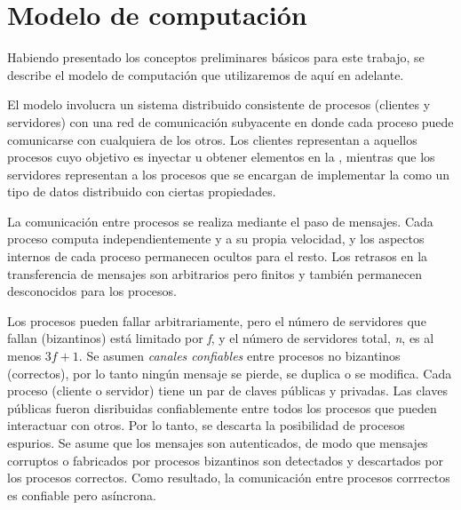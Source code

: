 \section{Modelo de computación}\label{sec:model_system}
Habiendo presentado los conceptos preliminares básicos para este trabajo, se describe
el modelo de computación que utilizaremos de aquí en adelante.

El modelo involucra un sistema distribuido consistente de procesos (clientes y servidores) con una
red de comunicación subyacente en donde cada proceso puede comunicarse con cualquiera de los otros.
Los clientes representan a aquellos procesos cuyo objetivo es inyectar u obtener elementos en la \setchain,
mientras que los servidores representan a los procesos que se encargan de implementar la \setchain
como un tipo de datos distribuido con ciertas propiedades.

La comunicación entre procesos se realiza mediante el paso de mensajes.
Cada proceso computa independientemente y a su propia velocidad, y los aspectos internos de cada proceso
permanecen ocultos para el resto. Los retrasos en la transferencia de mensajes son arbitrarios pero finitos
y también permanecen desconocidos para los procesos.

Los procesos pueden fallar arbitrariamente, pero el número de servidores que fallan (bizantinos) está
limitado por \textit{f}, y el número de servidores total, \textit{n}, es al menos $3f + 1$.
Se asumen \textit{canales confiables} entre procesos no bizantinos (correctos), por lo tanto ningún
mensaje se pierde, se duplica o se modifica.
Cada proceso (cliente o servidor) tiene un par de claves públicas y privadas.
Las claves públicas fueron disribuidas confiablemente entre todos los procesos que pueden interactuar
con otros.
Por lo tanto, se descarta la posibilidad de procesos espurios.
Se asume que los mensajes son autenticados, de modo que mensajes corruptos o fabricados por
procesos bizantinos son detectados y descartados por los procesos correctos.
Como resultado, la comunicación entre procesos corrrectos es confiable pero asíncrona.

